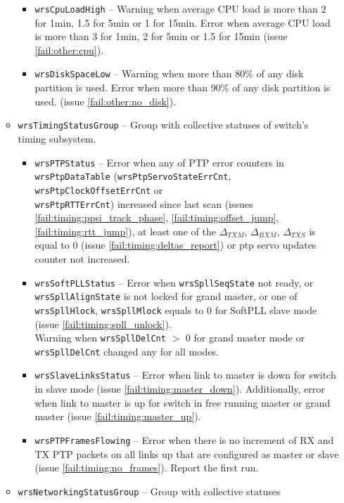 \begin{itemize}
\begin{itemize}
\begin{itemize}
	  \item \texttt{wrsCpuLoadHigh} -- Warning when average CPU load is
		more than 2 for 1min, 1.5 for 5min or 1 for 15min. Error when
		average CPU load is more than 3 for 1min, 2 for 5min or 1.5 for
		15min (issue \ref{fail:other:cpu}).
	  \item \texttt{wrsDiskSpaceLow} -- Warning when more than 80\% of any
		disk partition is used. Error when more than 90\% of any disk
		partition is used. (issue \ref{fail:other:no_disk}).
	\end{itemize}
      \item \texttt{wrsTimingStatusGroup} -- Group with collective statuses of
	    switch's timing subsystem.
	\begin{itemize}
	  \item \texttt{wrsPTPStatus} -- Error when any of PTP error counters
		in \texttt{wrsPtpDataTable} (\texttt{wrsPtpServoStateErrCnt},
		\texttt{wrsPtpClockOffsetErrCnt} or\\ \texttt{wrsPtpRTTErrCnt})
		increased since last scan (issues
		\ref{fail:timing:ppsi_track_phase},
		\ref{fail:timing:offset_jump},
		\ref{fail:timing:rtt_jump}), at least one of the 
		$\Delta_{TXM}$, $\Delta_{RXM}$, $\Delta_{TXS}$ is equal to 0
		(issue \ref{fail:timing:deltas_report}) or ptp servo
		updates counter not increased.
	  \item \texttt{wrsSoftPLLStatus} -- Error when \texttt{wrsSpllSeqState} not
		ready, or \\ \texttt{wrsSpllAlignState} is not locked for
		grand master, or one of \texttt{wrsSpllHlock},
		\texttt{wrsSpllMlock} equals to 0 for SoftPLL slave mode (issue
		\ref{fail:timing:spll_unlock}).\\
		Warning when \texttt{wrsSpllDelCnt} $>$ 0 for grand master mode
		or \texttt{wrsSpllDelCnt} changed any for all modes.
	  \item \texttt{wrsSlaveLinksStatus} -- Error when link to master is
		down for switch in slave mode (issue
		\ref{fail:timing:master_down}). Additionally, error when link
		to master is up for switch in free running master or grand
		master (issue \ref{fail:timing:master_up}).
	  \item \texttt{wrsPTPFramesFlowing} -- Error when there is no
		increment of RX and TX PTP packets on all links up that are 
		configured as master or slave (issue
		\ref{fail:timing:no_frames}). Report the first run.
	\end{itemize}
      \item \texttt{wrsNetworkingStatusGroup} -- Group with collective statuses

\end{itemize}
\end{itemize}
